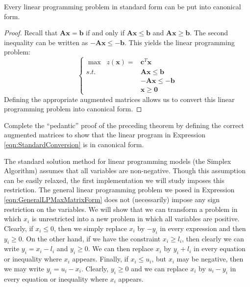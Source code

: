 \begin{theorem} Every linear programming problem in standard form can be put into canonical form.
\end{theorem}
\begin{proof} Recall that $\mathbf{A}\mathbf{x} = \mathbf{b}$ if and only if $\mathbf{A}\mathbf{x} \leq \mathbf{b}$ and $\mathbf{A}\mathbf{x} \geq \mathbf{b}$. The second inequality can be written as $-\mathbf{A}\mathbf{x} \leq -\mathbf{b}$. This yields the linear programming problem:
\begin{equation}
\left\{
\begin{aligned}
\max\;\; z(\mathbf{x}) = &\mathbf{c}^T\mathbf{x}\\
s.t.\;\;&\mathbf{A}\mathbf{x} \leq \mathbf{b}\\
& -\mathbf{A}\mathbf{x} \leq -\mathbf{b}\\
& \mathbf{x} \geq \mathbf{0}
\end{aligned}\right.
\label{eqn:StandardConversion}
\end{equation}
Defining the appropriate augmented matrices allows us to convert this linear programming problem into canonical form.
\end{proof}
\begin{exercise} Complete the ``pedantic'' proof of the preceding theorem by defining the correct augmented matrices to show that the linear program in Expression \ref{eqn:StandardConversion} is in canonical form.
\end{exercise}

The standard solution method for linear programming models (the Simplex Algorithm) assumes that all variables are non-negative. Though this assumption can be easily relaxed, the first implementation we will study imposes this restriction. The general linear programming problem we posed in Expression \ref{eqn:GeneralLPMaxMatrixForm} does not (necessarily) impose any sign restriction on the variables. We will show that we can transform a problem in which $x_i$ is unrestricted into a new problem in which all variables are positive. Clearly, if $x_i \leq 0$, then we simply replace $x_i$ by $-y_i$ in every expression and then $y_i \geq 0$. On the other hand, if we have the constraint $x_i \geq l_i$, then clearly we can write $y_i = x_i - l_i$ and $y_i \geq 0$. We can then replace $x_i$ by $y_i + l_i$ in every equation or inequality where $x_i$ appears. Finally, if $x_i \leq u_i$, but $x_i$ may be negative, then we may write $y_i = u_i - x_i$. Clearly, $y_i \geq 0$ and we can replace $x_i$ by $u_i - y_i$ in every equation or inequality where $x_i$ appears. 

